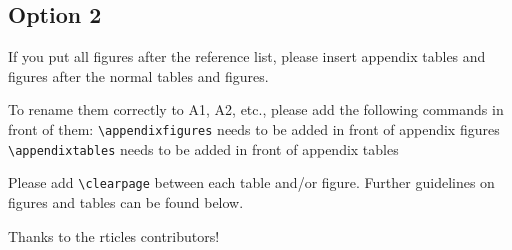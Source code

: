 \documentclass[gc, manuscript]{copernicus}
\begin{document}
\subsection{Option 2}

If you put all figures after the reference list, please insert appendix
tables and figures after the normal tables and figures.

To rename them correctly to A1, A2, etc., please add the following
commands in front of them: \texttt{\textbackslash{}appendixfigures}
needs to be added in front of appendix figures
\texttt{\textbackslash{}appendixtables} needs to be added in front of
appendix tables

Please add \texttt{\textbackslash{}clearpage} between each table and/or
figure. Further guidelines on figures and tables can be found below.
\noappendix




\begin{acknowledgements}
Thanks to the rticles contributors!
\end{acknowledgements}







\end{document}
